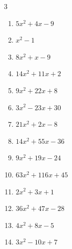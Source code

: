 \begin{multicols}{3}
\begin{enumerate}
        \phantom{$=(5x+6)(2x+1)$}

  \item $5x^{2}+4x-9$

        \phantom{$=(5x+9)(x-1)$}

  \item $x^{2}-1$

        \phantom{$=(x+1)(x-1)$}

  \item $8x^{2}+x-9$

        \phantom{$=(8x+9)(x-1)$}

  \item $14x^{2}+11x+2$

        \phantom{$=(2x+1)(7x+2)$}

  \item $9x^{2}+22x+8$

        \phantom{$=(9x+4)(x+2)$}

  \item $3x^{2}-23x+30$

        \phantom{$=(3x-5)(x-6)$}

  \item $21x^{2}+2x-8$

        \phantom{$=(7x-4)(3x+2)$}

\columnbreak %

  \item $14x^{2}+55x-36$

        \phantom{$=(7x-4)(2x+9)$}

  \item $9x^{2}+19x-24$

        \phantom{$=(x+3)(9x-8)$}

  \item $63x^{2}+116x+45$

        \phantom{$=(9x+5)(7x+9)$}

  \item $2x^{2}+3x+1$

        \phantom{$=(2x+1)(x+1)$}

  \item $36x^{2}+47x-28$

        \phantom{$=(9x-4)(4x+7)$}

  \item $4x^{2}+8x-5$

        \phantom{$=(2x-1)(2x+5)$}

  \item $3x^{2}-10x+7$

        \phantom{$=(x-1)(3x-7)$}


\end{enumerate}
\end{multicols}
